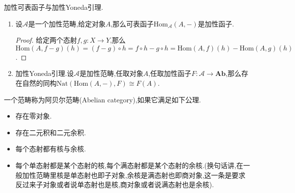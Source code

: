 加性可表函子与加性Yoneda引理.
\begin{enumerate}
	\item 设$\mathscr{A}$是一个加性范畴,给定对象$A$,那么可表函子$\mathrm{Hom}_{\mathscr{A}}(A,-)$是加性函子.
	\begin{proof}
		
		给定两个态射$f,g:X\to Y$,那么$\mathrm{Hom}(A,f-g)(h)=(f-g)\circ h=f\circ h-g\circ h=\mathrm{Hom}(A,f)(h)-\mathrm{Hom}(A,g)(h)$.
	\end{proof}
    \item 加性Yoneda引理.设$\mathscr{A}$是加性范畴,任取对象$A$,任取加性函子$F:\mathscr{A}\to\textbf{Ab}$,那么存在自然的同构$\mathrm{Nat}(\mathrm{Hom}(A,-),F)\cong F(A)$.
\end{enumerate}

一个范畴称为阿贝尔范畴(Abelian category),如果它满足如下公理.
\begin{itemize}
	\item 存在零对象.
	\item 存在二元积和二元余积.
	\item 每个态射都有核与余核.
	\item 每个单态射都是某个态射的核,每个满态射都是某个态射的余核.(换句话讲,在一般加性范畴里核是单态射也即子对象,余核是满态射也即商对象,这一条是要求反过来子对象或者说单态射也是核,商对象或者说满态射也是余核).
\end{itemize}
